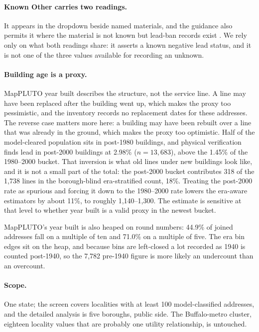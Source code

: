 \documentclass[11pt]{article}
\newcommand{\KO}{\textsf{Known Other}}
\begin{document}
\paragraph{\KO{} carries two readings.}
It appears in the dropdown beside named materials, and the guidance also permits it where the
material is not known but lead-ban records exist \cite{nysdohguidance2025}. We rely only on
what both readings share: it asserts a known negative lead status, and it is not one of the
three values available for recording an unknown.

\paragraph{Building age is a proxy.}
MapPLUTO year built describes the structure, not the service line. A line may have been
replaced after the building went up, which makes the proxy too pessimistic, and the inventory
records no replacement dates for these addresses. The reverse case matters more here: a
building may have been rebuilt over a line that was already in the ground, which makes the
proxy too optimistic. Half of the model-cleared population sits in post-1980 buildings, and
physical verification finds lead in post-2000 buildings at 2.98\% ($n = 13{,}683$), above the
1.45\% of the 1980--2000 bucket. That inversion is what old lines under new buildings look
like, and it is not a small part of the total: the post-2000 bucket contributes 318 of the
1,738 lines in the borough-blind era-stratified count, 18\%. Treating the post-2000 rate as
spurious and forcing it down to the 1980--2000 rate lowers the era-aware estimators by about
11\%, to roughly 1,140--1,300. The estimate is sensitive at that level to whether year built
is a valid proxy in the newest bucket.

MapPLUTO's year built is also heaped on round numbers: 44.9\% of joined addresses fall on a
multiple of ten and 71.0\% on a multiple of five. The era bin edges sit on the heap, and
because bins are left-closed a lot recorded as 1940 is counted post-1940, so the 7,782
pre-1940 figure is more likely an undercount than an overcount.

\paragraph{Scope.}
One state; the screen covers localities with at least 100 model-classified addresses, and the
detailed analysis is five boroughs, public side. The Buffalo-metro cluster, eighteen locality
values that are probably one utility relationship, is untouched.
\end{document}
